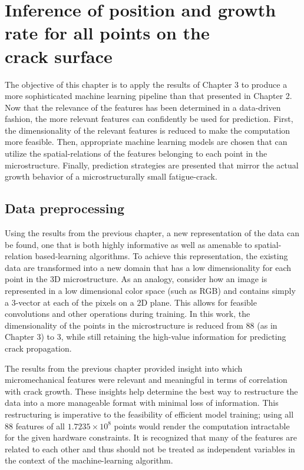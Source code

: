 \chapter[Inference of position and growth rate for all points on the crack surface]{Inference of position and growth rate for all points on the \\ crack surface}
The objective of this chapter is to apply the results of Chapter 3 to produce a more sophisticated machine learning pipeline than that presented in Chapter 2.  Now that the relevance of the features has been determined in a data-driven fashion, the more relevant features can confidently be used for prediction.  First, the dimensionality of the relevant features is reduced to make the computation more feasible.  Then, appropriate machine learning models are chosen that can utilize the spatial-relations of the features belonging to each point in the microstructure.  Finally, prediction strategies are presented that mirror the actual growth behavior of a microstructurally small fatigue-crack.

\section{Data preprocessing}
Using the results from the previous chapter, a new representation of the data can be found, one that is both highly informative as well as amenable to spatial-relation based-learning algorithms.  To achieve this representation, the existing data are transformed into a new domain that has a low dimensionality for each point in the 3D microstructure.  As an analogy, consider how an image is represented in a low dimensional color space (such as RGB) and contains simply a 3-vector at each of the pixels on a 2D plane.  This allows for feasible convolutions and other operations during training.  In this work, the dimensionality of the points in the microstructure is reduced from 88 (as in Chapter 3) to 3, while still retaining the high-value information for predicting crack propagation.

The results from the previous chapter provided insight into which micromechanical features were relevant and meaningful in terms of correlation with crack growth.  These insights help determine the best way to restructure the data into a more manageable format with minimal loss of information.  This restructuring is imperative to the feasibility of efficient model training; using all 88 features of all $1.7235 \times 10^8$ points would render the computation intractable for the given hardware constraints.  It is recognized that many of the features are related to each other and thus should not be treated as independent variables in the context of the machine-learning algorithm.

